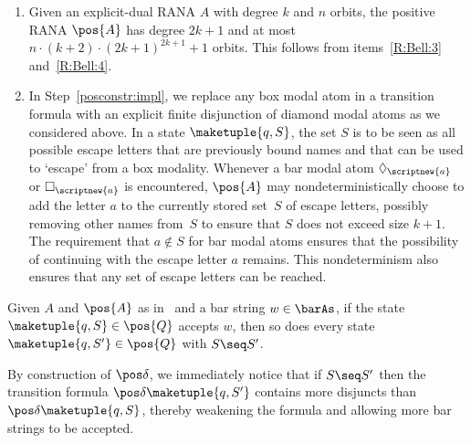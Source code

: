 \documentclass[10pt, final, conference, a4paper, twocolumn]{IEEEtran}
\renewcommand{\enquote}[1]{`#1'}
\begin{document}
\begin{rem}
  \begin{enumerate}%
    \item Given an explicit-dual RANA $A$ with degree $k$ and $n$ orbits, the positive
      RANA $\pos{A}$ has degree $2k + 1$ and at most $n \cdot (k + 2) \cdot (2k + 1)^{2k + 1}+1$ orbits.
      This follows from  items~\ref{R:Bell:3} and~\ref{R:Bell:4}. 
      
    \item In Step~\ref{posconstr:impl}, we replace any box modal atom in a transition
      formula with an explicit finite disjunction of diamond modal atoms as we considered
      above. In a state $\maketuple{q, S}$, the set $S$ is to be seen as all possible
      escape letters that are previously bound names and that can be used to \enquote{escape}
      from a box modality. Whenever a bar modal atom $\Diamond_{\scriptnew{a}}$ or
      $\Box_{\scriptnew{a}}$ is encountered, $\pos{A}$ may nondeterministically choose
      to add the letter $a$ to the currently stored set~$S$ of escape letters, possibly
      removing other names from~$S$ to ensure that $S$ does not exceed size $k+1$. 
      The requirement that $a \notin S$ for bar modal atoms ensures that the possibility
      of continuing with the escape letter $a$ remains. This
      nondeterminism also ensures that any set of escape letters can be reached.
  \end{enumerate}
\end{rem}

\begin{lem}\label{lem:relStatesPos}
  Given $A$ and $\pos{A}$ as in~ and a
  bar string $w \in \barAs$, if the state $\maketuple{q,S} \in \pos{Q}$
  accepts $w$, then so does every state $\maketuple{q,S'} \in \pos{Q}$ with $S \seq S'$.
\end{lem}
\begin{IEEEproof}
  By construction of $\pos\delta$, we immediately notice that
  if $S \seq S'$ then the transition formula $\pos\delta\maketuple{q,S'}$
  contains more disjuncts than $\pos\delta\maketuple{q,S}$,
  thereby weakening the formula and allowing more bar strings to be accepted.
\end{IEEEproof}
\end{document}
